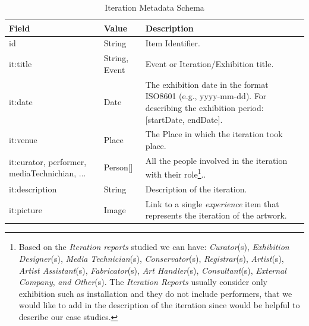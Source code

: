 \begin{longtable}{|p{}|p{}|p{}|}
    \caption{Iteration Metadata Schema} \label{tab:c4-iteration} \\
    \hline
    \textbf{Field} & \textbf{Value} & \textbf{Description} \\
    \hline
    \endfirsthead
    \scriptsize id                      & \scriptsize String                                            &  \scriptsize Item Identifier. \\
    \hline
    \scriptsize it:title                   & \scriptsize String, \textcolor{uniudColor3}{Event}            &  \scriptsize Event or Iteration/Exhibition title.\\
    \hline
    \scriptsize it:date                    & \scriptsize Date                                              &  \scriptsize The exhibition date in the format ISO8601 (e.g., yyyy-mm-dd). For describing the exhibition period: [startDate, endDate].\\
    \hline
    \scriptsize it:venue                   & \scriptsize \textcolor{uniudColor3}{Place}                    &  \scriptsize The Place in which the iteration took place. \\
    \hline
    \scriptsize it:curator, performer, mediaTechnichian, ...                 & \scriptsize \textcolor{uniudColor3}{Person}[]                    &  \scriptsize All the people involved in the iteration with their role\footnote{Based on the \textit{Iteration reports} studied we can have: \textit{Curator}(s), \textit{Exhibition Designer}(s), \textit{Media Technician}(s), \textit{Conservator}(s), \textit{Registrar}(s), \textit{Artist}(s), \textit{Artist Assistant}(s), \textit{Fabricator}(s), \textit{Art Handler}(s), \textit{Consultant}(s), \textit{External Company}, \textit{and Other}(s). The \textit{Iteration Reports} usually consider only exhibition such as installation and they do not include performers, that we would like to add in the description of the iteration since would be helpful to describe our case studies.}..\\
    \hline
    \scriptsize it:description             & \scriptsize String                                            &  \scriptsize Description of the iteration. \\
    \hline
    \scriptsize it:picture                 & \scriptsize \textcolor{uniudColor3}{Image}                    &  \scriptsize Link to a single \textit{experience} item that represents the iteration of the artwork.\\

\end{longtable}
